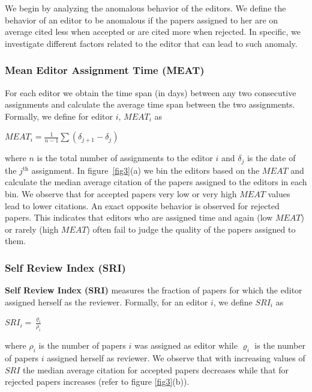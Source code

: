 We begin by analyzing the anomalous behavior of the editors. We define the behavior of an editor to be anomalous if the papers assigned to her are on average cited less when accepted or are cited more when rejected. In specific, we investigate different factors related to the editor that can lead to such anomaly.
\subsubsection{Mean Editor Assignment Time (MEAT)}
For each editor we obtain the time span (in days) between any two consecutive assignments and calculate the average time span between the two assignments. 
Formally, we define for editor $i$, $MEAT_{i}$ as
\begin{center}
$MEAT_{i}=\frac{1}{n-1}\sum (\delta_{j+1} - \delta_{j})$
\end{center}
where $n$ is the total number of assignments to the editor $i$ and $\delta_{j}$ is the date of the $j$$^\textrm{th}$ assignment. 
In figure~\ref{fig3}(a) we bin the editors based on the $MEAT$ and calculate the median average citation of the papers assigned to the editors in each bin. 
{We observe that for accepted papers very low or very high $MEAT$ values lead to lower citations. An exact opposite behavior is observed for rejected papers. 
This indicates that editors who are assigned time and again (low $MEAT$) or rarely (high $MEAT$) often fail to judge the quality of the papers assigned to them.} 

\subsubsection{Self Review Index (SRI)}

{\bf Self Review Index (SRI)} measures the fraction of papers for which the editor assigned herself as the reviewer. 
Formally, for an editor $i$, we define $SRI_{i}$ as 
\begin{center}
$SRI_{i}=\frac{\varrho_{i}}{\rho_{i}}$
\end{center}
where $\rho_{i}$ is the number of papers $i$ was assigned as editor while $\varrho_{i}$ is the number of papers $i$ assigned herself as reviewer. We observe that with increasing values of $SRI$ the median average citation for accepted papers decreases while that for rejected papers increases (refer to figure \ref{fig3}(b)). 

